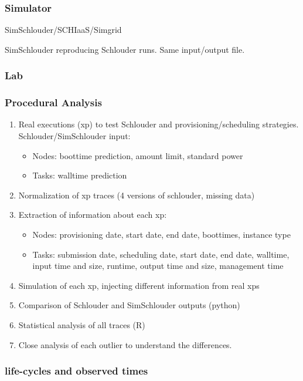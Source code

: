 \documentclass[a4paper,10pt]{article}
\begin{document}
\subsubsection{Simulator}

SimSchlouder/SCHIaaS/Simgrid

SimSchlouder reproducing Schlouder runs. Same input/output file.

\subsubsection{Lab}

\subsubsection{Procedural Analysis}

\begin{enumerate}
 \item Real executions (xp) to test Schlouder and provisioning/scheduling 
strategies.
  Schlouder/SimSchlouder input:
  \begin{itemize}
   \item Nodes: boottime prediction, amount limit, standard power
   \item Tasks: walltime prediction
  \end{itemize}
 
 \item Normalization of xp traces (4 versions of schlouder, missing data)
 \item Extraction of information about each xp:
  \begin{itemize}
   \item Nodes: provisioning date, start date, end date, boottimes, instance 
type
   \item Tasks: submission date, scheduling date, start date, end date, 
	  walltime, input time and size, runtime, output time and size, 
management time
  \end{itemize}
 \item Simulation of each xp, injecting different information from real xps
 \item Comparison of Schlouder and SimSchlouder outputs (python)
 \item Statistical analysis of all traces (R)
 \item Close analysis of each outlier to understand the differences. 
\end{enumerate}

\subsubsection{life-cycles and observed times}
\end{document}
